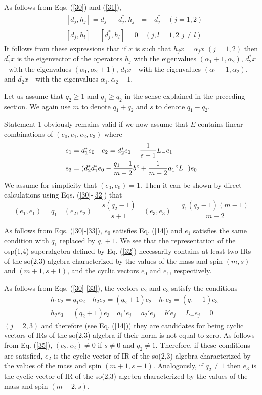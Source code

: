 \documentclass[a4paper,12pt]{article}%
\begin{document}
As follows from Eqs. (\ref{30}) and (\ref{31}),
\begin{eqnarray}
&[d_j,h_j]=d_j\quad [d_j^*,h_j]=-d_j^*\quad (j=1,2)\nonumber\\
&[d_j,h_l]=[d_j^*,h_l]=0\quad (j,l=1,2\,\, j\neq l)
\label{33}
\end{eqnarray}
It follows from these expressions that if $x$ is such that
$h_jx=\alpha_jx$ $(j=1,2)$ then $d_1^*x$ is the eigenvector of the
operators $h_j$ with the eigenvalues $(\alpha_1+1,\alpha_2)$, 
$d_2^*x$ - with the eigenvalues $(\alpha_1,\alpha_2+1)$, 
$d_1x$ - with the eigenvalues $(\alpha_1-1,\alpha_2)$, 
and $d_2x$ - with the eigenvalues $\alpha_1,\alpha_2-1$.

Let us assume that $q_2\geq 1$ and $q_1\geq q_2$ in the
sense explained in the preceding section. We again use $m$
to denote $q_1+q_2$ and $s$ to denote $q_1-q_2$. 

Statement 1 obviously remains valid if we now assume that $E$
contains linear combinations of $(e_0,e_1,e_2,e_3)$ where 
\begin{eqnarray}
&e_1=d_1^*e_0\quad e_2=d_2^*e_0-\frac{1}{s+1}L_-e_1\nonumber\\ 
&e_3=(d_2^*d_1^*e_0-\frac{q_1-1}{m-2}b"+
\frac{1}{m-2}a_1"L_-)e_0
\label{34}
\end{eqnarray}
We assume for simplicity that $(e_0,e_0)=1$. Then
it can be shown by direct calculations using Eqs. 
(\ref{30}-\ref{32}) that 
\begin{equation}
(e_1,e_1)=q_1 \quad (e_2,e_2)=\frac{s(q_2-1)}{s+1}
\quad (e_3,e_3)=\frac{q_1(q_2-1)(m-1)}{m-2}
\label{35}
\end{equation}

As follows from Eqs. (\ref{30}-\ref{33}),  
$e_0$ satisfies Eq. (\ref{14}) and $e_1$ satisfies
the same condition with $q_1$ replaced by $q_1+1$. 
We see that the representation of the osp(1,4) superalgebra 
defined by Eq. (\ref{32}) necessarily contains at least two
IRs of the so(2,3) algebra characterized by the values of the
mass and spin $(m,s)$ and $(m+1,s+1)$, and the cyclic vectors
$e_0$ and $e_1$, respectively.

As follows from Eqs. (\ref{30}-\ref{33}), the vectors 
$e_2$ and $e_3$ satisfy the conditions 
\begin{eqnarray}
&h_1e_2=q_1e_2\quad h_2e_2=(q_2+1)e_2 \quad
h_1e_3=(q_1+1)e_3 \nonumber\\
&h_2e_3=(q_2+1)e_3\quad a_1'e_j=a_2'e_j=b'e_j=L_+e_j=0
\label{36}
\end{eqnarray}
$(j=2,3)$ and therefore (see Eq. (\ref{14})) they are 
candidates for
being cyclic vectors of IRs of the so(2,3) algebra if their
norm is not equal to zero. As follows from Eq. (\ref{35}),
$(e_2,e_2)\neq 0$ if $s\neq 0$ and $q_2\neq 1$. Therefore,
if these conditions are satisfied, $e_2$ is the cyclic vector
of IR of the so(2,3) algebra characterized by the values of
the mass and spin $(m+1,s-1)$. Analogously, if $q_2\neq 1$ then
$e_3$ is the cyclic vector of IR of the so(2,3) algebra 
characterized by the values of the mass and spin $(m+2,s)$. 
\end{document}
